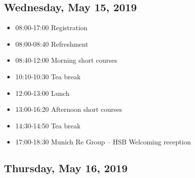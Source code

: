 \documentclass[10pt]{article}
\begin{document}
\subsection*{Wednesday, May 15, 2019}
\begin{itemize}
\item
  08:00-17:00 \hfill Registration
\item
  08:00-08:40 \hfill Refreshment
\item
  08:40-12:00 \hfill Morning short courses
\item
  10:10-10:30 \hfill Tea break
\item
  12:00-13:00 \hfill Lunch
\item
  13:00-16:20 \hfill Afternoon short courses
\item
  14:30-14:50 \hfill Tea break
\item
  17:00-18:30 \hfill Munich Re Group -- HSB Welcoming reception
\end{itemize}

  





\vfill
\subsection*{Thursday, May 16, 2019}
\end{document}

